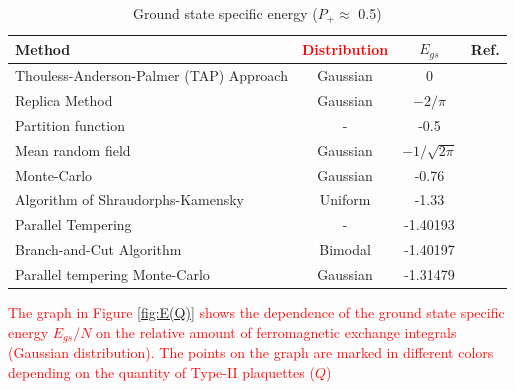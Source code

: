 \documentclass[preprint,12pt]{elsarticle}
\begin{document}
\begin{table}[h]
	\begin{tabular}{|l|c|c|l|}
		\hline
		Method     &     \textcolor{red}{Distribution}                         &
		  $E_{gs}$                                       &  Ref.                                          \\ \hline
		Thouless-Anderson-Palmer (TAP) Approach& Gaussian &  0                                              & \cite{thouless1977solution}    \\ \hline
		Replica Method   & Gaussian                         & $-2/\pi$                                       & \cite{sherrington1975solvable} \\ \hline
		Partition function   &   -                 & -0.5                                           & \cite{tanaka1980analytic}      \\ \hline
		Mean random field  &   Gaussian  &                   $-1/\sqrt{2\pi}$                               & \cite{klein1976comparison}     \\ \hline
		Monte-Carlo      &   Gaussian    &        -0.76                                          & \cite{kirkpatrick1978infinite} \\ \hline
		Algorithm of Shraudorphs-Kamensky   &  Uniform &     -1.33                                          & \cite{karandashev2019global}   \\ \hline
		Parallel Tempering &   -       & -1.40193                                       & \cite{palmer1999ground}        \\ \hline
		Branch-and-Cut Algorithm  & Bimodal               & -1.40197                         
		& \cite{campbell2004energy}      \\ \hline
		
		Parallel tempering Monte-Carlo    &  Gaussian         & -1.31479                                       & \cite{roma2009ground}          \\ \hline
		
		
		
	\end{tabular}
	\caption{Ground state specific energy ($P_+\approx$ 0.5)}
	\label{tab:Egs}
\end{table}
\textcolor{red}{
The graph in Figure \ref{fig:E(Q)} shows the dependence of the ground state specific energy $E_{gs}/N$ on the relative amount of ferromagnetic exchange integrals (Gaussian distribution). The points on the graph are marked in different colors depending on the quantity of Type-II plaquettes ($Q$)}
\end{document}
